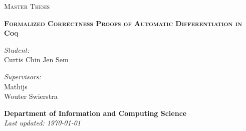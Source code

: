 \begin{titlepage}

  \begin{figure}
    \begin{minipage}{0.48\textwidth}
    \begin{flushleft}
    \end{flushleft}
    \end{minipage}\hfill
    \begin{minipage}{0.48\textwidth}
    \begin{flushright}
    \end{flushright}
    \end{minipage}
  \end{figure}

  \thispagestyle{fancy}

  \vspace{1in}

  \center

  \textsc{\large Master Thesis}

  \vspace{0.5in}

  \noindent\makebox[\linewidth]{\rule{\linewidth}{1.2pt}}
  \textsc{\textbf{\large Formalized Correctness Proofs of Automatic Differentiation in Coq}}
  \noindent\makebox[\linewidth]{\rule{\linewidth}{1.2pt}}

  \vspace{0.5in}

  \begin{minipage}{0.48\textwidth}
    \begin{flushleft}
      \textit{Student:} \\
      Curtis Chin Jen Sem \\
    \end{flushleft}
  \end{minipage}
  \begin{minipage}{0.48\textwidth}
    \begin{flushright}
    \textit{Supervisors:} \\
    Mathijs \Vakar \\
    Wouter Swierstra \\
    \end{flushright}
  \end{minipage}

  \vspace{2in}

  \textbf{\large Department of Information and Computing Science} \\
  \textit{Last updated: \today}
\end{titlepage}
